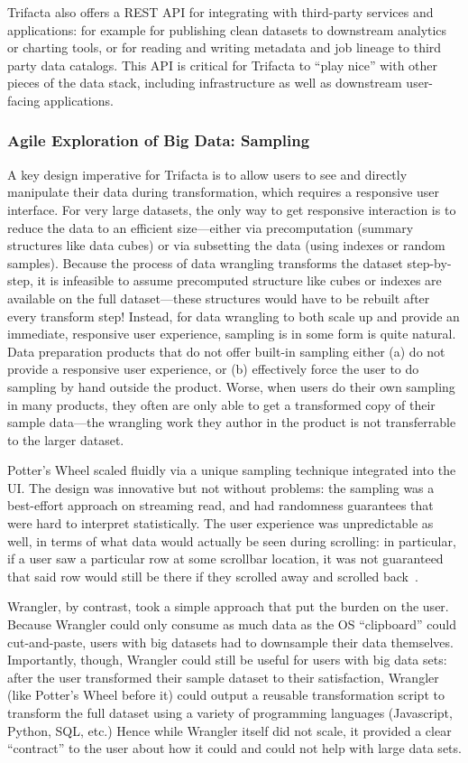 \documentclass[11pt]{article}
\begin{document}
Trifacta also offers a REST API for integrating with third-party services and applications: for example for publishing clean datasets to downstream analytics or charting tools, or for reading and writing metadata and job lineage to third party data catalogs. This API is critical for Trifacta to ``play nice'' with other pieces of the data stack, including infrastructure as well as downstream user-facing applications.

\subsubsection{Agile Exploration of Big Data: Sampling}
A key design imperative for Trifacta is to allow users to see and directly manipulate their data during transformation, which requires a responsive user interface. For very large datasets, the only way to get responsive interaction is to reduce the data to an efficient size---either via precomputation (summary structures like data cubes) or via subsetting the data (using indexes or random samples). Because the process of data wrangling transforms the dataset step-by-step, it is infeasible to assume precomputed structure like cubes or indexes are available on the full dataset---these structures would have to be rebuilt after every transform step! Instead, for data wrangling to both scale up and provide an immediate, responsive user experience, sampling is in some form is quite natural. Data preparation products that do not offer built-in sampling either (a) do not provide a responsive user experience, or (b) effectively force the user to do sampling by hand outside the product. Worse, when users do their own sampling in many products, they often are only able to get a transformed copy of their sample data---the wrangling work they author in the product is not transferrable to the larger dataset.

Potter's Wheel scaled fluidly via a unique sampling technique integrated into the UI. The design was innovative but not without problems: the sampling was a best-effort approach on streaming read, and had randomness guarantees that were hard to interpret statistically. The user experience was unpredictable as well, in terms of what data would actually be seen during scrolling: in particular, if a user saw a particular row at some scrollbar location, it was not guaranteed that said row would still be there if they scrolled away and scrolled back~\cite{raman2002partial}. 

Wrangler, by contrast, took a simple approach that put the burden  on the user. Because Wrangler could only consume as much data as the OS ``clipboard'' could cut-and-paste, users with big datasets had to downsample their data themselves. 
Importantly, though, Wrangler could still be useful for users with big data sets:
after the user transformed their sample dataset to their satisfaction, Wrangler (like Potter's Wheel before it) could output a reusable transformation script to transform the full dataset using a variety of programming languages (Javascript, Python, SQL, etc.) Hence while Wrangler itself did not scale, it provided a clear ``contract'' to the user about how it could and could not help with large data sets.
\end{document}
